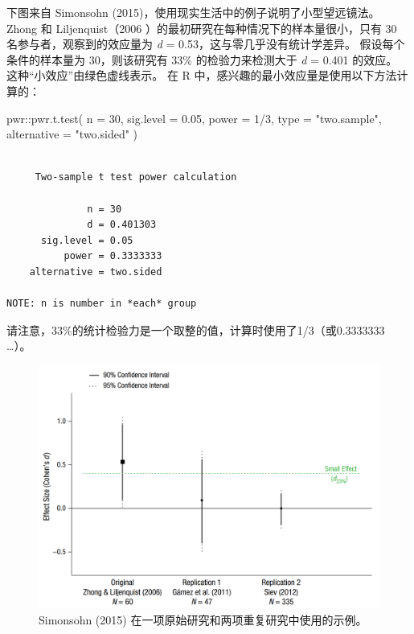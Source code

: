 \documentclass[
  letterpaper,
  DIV=11,
  numbers=noendperiod]{scrreprt}
\newenvironment{Shaded}{\begin{snugshade}}{\end{snugshade}}
\newcommand{\AttributeTok}[1]{\textcolor[rgb]{0.40,0.45,0.13}{#1}}
\newcommand{\DecValTok}[1]{\textcolor[rgb]{0.68,0.00,0.00}{#1}}
\newcommand{\FloatTok}[1]{\textcolor[rgb]{0.68,0.00,0.00}{#1}}
\newcommand{\FunctionTok}[1]{\textcolor[rgb]{0.28,0.35,0.67}{#1}}
\newcommand{\NormalTok}[1]{\textcolor[rgb]{0.00,0.23,0.31}{#1}}
\newcommand{\SpecialCharTok}[1]{\textcolor[rgb]{0.37,0.37,0.37}{#1}}
\newcommand{\StringTok}[1]{\textcolor[rgb]{0.13,0.47,0.30}{#1}}
\begin{document}
下图来自 Simonsohn (2015)，使用现实生活中的例子说明了小型望远镜法。
Zhong 和 Liljenquist（2006 ）的最初研究在每种情况下的样本量很小，只有 30
名参与者，观察到的效应量为 \emph{d} = 0.53，这与零几乎没有统计学差异。
假设每个条件的样本量为 30，则该研究有 33\% 的检验力来检测大于 \emph{d} =
0.401 的效应。 这种``小效应''由绿色虚线表示。 在 R
中，感兴趣的最小效应量是使用以下方法计算的：

\begin{Shaded}
\begin{Highlighting}[]
\NormalTok{pwr}\SpecialCharTok{::}\FunctionTok{pwr.t.test}\NormalTok{(}
  \AttributeTok{n =} \DecValTok{30}\NormalTok{, }
  \AttributeTok{sig.level =} \FloatTok{0.05}\NormalTok{, }
  \AttributeTok{power =} \DecValTok{1}\SpecialCharTok{/}\DecValTok{3}\NormalTok{, }
  \AttributeTok{type =} \StringTok{"two.sample"}\NormalTok{,}
  \AttributeTok{alternative =} \StringTok{"two.sided"}
\NormalTok{)}
\end{Highlighting}
\end{Shaded}

\begin{verbatim}

     Two-sample t test power calculation 

              n = 30
              d = 0.401303
      sig.level = 0.05
          power = 0.3333333
    alternative = two.sided

NOTE: n is number in *each* group
\end{verbatim}

请注意，33\%的统计检验力是一个取整的值，计算时使用了1/3（或0.3333333
\ldots）。

\begin{figure}

{\centering \includegraphics[width=1\textwidth,height=\textheight]{images/a4aa20a6e2dadfbaa82bc614d40693c7.png}

}

\caption{\label{fig-simonsohnexample}Simonsohn (2015)
在一项原始研究和两项重复研究中使用的示例。}

\end{figure}
\end{document}
